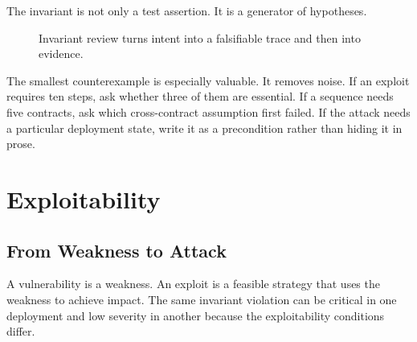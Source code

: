 The invariant is not only a test assertion. It is a generator of hypotheses.

\begin{figure}[htbp]
\centering
{}
\caption{Invariant review turns intent into a falsifiable trace and then into evidence.}
\end{figure}

The smallest counterexample is especially valuable. It removes noise. If an exploit requires ten steps, ask whether three of them are essential. If a sequence needs five contracts, ask which cross-contract assumption first failed. If the attack needs a particular deployment state, write it as a precondition rather than hiding it in prose.

\section{Exploitability}

\subsection{From Weakness to Attack}

A vulnerability is a weakness. An exploit is a feasible strategy that uses the weakness to achieve impact. The same invariant violation can be critical in one deployment and low severity in another because the exploitability conditions differ.

